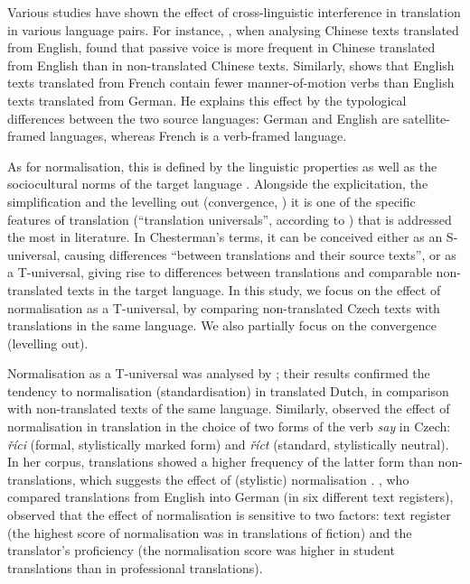 \documentclass[output=paper,russian]{langsci/langscibook}
\begin{document}
Various studies have shown the effect of cross-linguistic interference in translation in various language pairs. For instance, \textcite{daixia11}, when analysing Chinese texts translated from English, found that passive voice is more frequent in Chinese translated from English than in non-translated Chinese texts. Similarly, \textcite{cappelle12} shows that English texts translated from French contain fewer manner-of-motion verbs than English texts translated from German. He explains this effect by the typological differences between the two source languages: German and English are satellite-framed languages, whereas French is a verb-framed language. 

As for normalisation, this is defined by the linguistic properties as well as the sociocultural norms of the target language \parencite[see][17]{lefvog13}. Alongside the explicitation, the simplification and the levelling out (convergence, \cite{laviosa02}) it is one of the specific features of translation (\enquote{translation universals}, according to \textcites{baker93}{baker96}) that is addressed the most in literature. In Chesterman's \parencite*[39]{chesterman04} terms, it can be conceived either as an S-universal, causing differences \enquote{between translations and their source texts}, or as a T-universal, giving rise to differences between translations and comparable non-translated texts in the target language. In this study, we focus on the effect of normalisation as a T-universal, by comparing non-translated Czech texts with translations in the same language. We also partially focus on the convergence (levelling out).

Normalisation as a T-universal was analysed by \textcite{deletal12}; their results confirmed the tendency to normalisation (standardisation) in translated Dutch, in comparison with non-translated texts of the same language. Similarly, \textcite{chlumska17} observed the effect of normalisation in translation in the choice of two forms of the verb \textit{say} in Czech: \textit{říci} (formal, stylistically marked form) and \textit{říct} (standard, stylistically neutral). In her corpus, translations showed a higher frequency of the latter form than non-translations, which suggests the effect of (stylistic) normalisation \parencite[65]{chlumska17}. \textcite{lapshinova18}, who compared translations from English into German (in six different text registers), observed that the effect of normalisation is sensitive to two factors: text register (the highest score of normalisation was in translations of fiction) and the translator’s proficiency (the normalisation score was higher in student translations than in professional translations).
\end{document}
